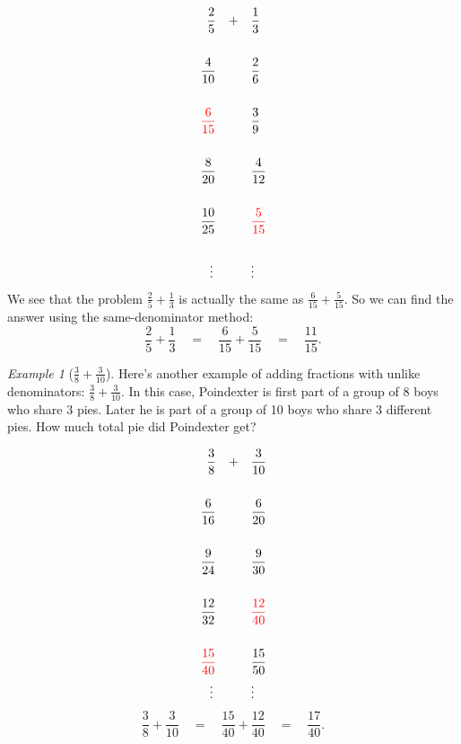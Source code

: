 \documentclass[10pt, reqno]{amsart}
\theoremstyle{remark}
\newtheorem{example}[thm]{Example}
\theoremstyle{definition}
\numberwithin{equation}{section}  %
\begin{document}
\begin{align*}
\frac 2 5 \quad + &\quad  \frac 1 3\\
\\
\frac 4{10}\quad \phantom {+} & \quad \frac 2 6\\
\\
{\color{red} \frac 6{15}}\quad \phantom {+} & \quad \frac 3 9\\
\\
\frac 8{20}\quad \phantom {+} & \quad \frac 4 {12}\\
\\
\frac {10}{25}\quad \phantom {+} & \quad {\color{red} \frac 5 {15}}\\
\\
\vdots \qquad &\quad \vdots
\end{align*}
We see that the
problem $\frac 2 5 + \frac 1 3$ 
is actually the same as $\frac 6{15} + \frac5{15}$.  So we can find the answer using the same-denominator method:
\[
\frac 2 5 + \frac 1 3 
\quad = \quad
\frac 6{15} + \frac 5{15}
 \quad = \quad 
 \frac{11}{15}.
\]



\begin{example}[$\frac 38 + \frac 3{10}$]
Here's another example of adding fractions with unlike denominators: $\frac 38 + \frac 3{10}$.  In this case, Poindexter is first part of a group of 8 boys who share 3 pies.  Later he is part of a group of 10 boys who share 3 different pies.  How much total pie did Poindexter get?

\begin{align*}
\frac 38 \quad + &\quad  \frac 3{10}\\
\\
\frac 6{16}\quad \phantom {+} & \quad \frac 6 {20}\\
\\
 \frac 9{24}\quad \phantom {+} & \quad \frac 9 {30}\\
\\
\frac {12}{32}\quad \phantom {+} & \quad {\color{red} \frac  {12}{40}}\\
\\
{\color{red} \frac {15}{40}}\quad \phantom {+} & \quad \frac  {15}{50}
\\
\vdots \qquad &\quad \vdots
\end{align*}
\[
\frac 38  +   \frac 3{10} 
\quad = \quad
 \frac{15}{40} + \frac{12}{40} 
 \quad = \quad
  \frac{17}{40}.
\]


\end{example}
\end{document}

